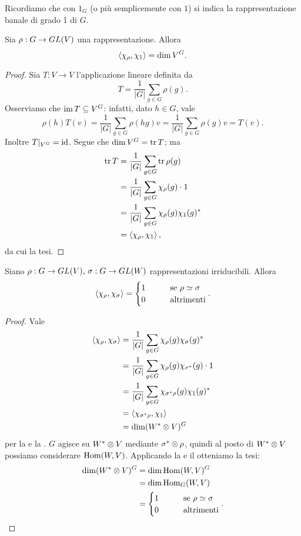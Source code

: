 Ricordiamo che con $1_G$ (o più semplicemente con $1$) si indica la rappresentazione banale di grado 1 di $G$.

\begin{proposition}
Sia $\rho:G\to GL(V)$ una rappresentazione. Allora
$$
\left\langle\chi_\rho,\chi_1\right\rangle=\dim V^G.
$$
\end{proposition}
\begin{proof}
Sia $T:V\to V$ l'applicazione lineare definita da
$$
T=\frac{1}{|G|}\sum_{g\in G}\rho(g).
$$
Osserviamo che $\operatorname{im} T\subseteq V^G$: infatti, dato $h\in G$, vale
$$
\rho(h)T(v)=\frac{1}{|G|}\sum_{g\in G}\rho(hg)v=\frac{1}{|G|}\sum_{g\in G}\rho(g)v=T(v).
$$
Inoltre $T|_{V^G}=\operatorname{id}$. Segue che $\dim V^G=\operatorname{tr} T$; ma
\begin{align*}
\operatorname{tr} T&=\frac{1}{|G|}\sum_{g\in G}\operatorname{tr}\rho(g)\\
&=\frac{1}{|G|}\sum_{g\in G}\chi_\rho(g)\cdot1\\
&=\frac{1}{|G|}\sum_{g\in G}\chi_\rho(g)\chi_1(g)^*\\
&=\left\langle\chi_\rho,\chi_1\right\rangle,
\end{align*}
da cui la tesi.
\end{proof}

\begin{proposition}
Siano $\rho:G\to GL(V),\,\allowbreak\sigma:G\to GL(W)$ rappresentazioni irriducibili. Allora 
$$
\left\langle\chi_\rho,\chi_\sigma\right\rangle=
\begin{cases}
1\qquad&\text{se $\rho\simeq\sigma$}\\
0\qquad&\text{altrimenti}
\end{cases}.
$$
\end{proposition}
\begin{proof}
Vale
\begin{align*}
\left\langle\chi_\rho,\chi_\sigma\right\rangle&=\frac{1}{|G|}\sum_{g\in G}\chi_\rho(g)\chi_\sigma(g)^*\\
&=\frac{1}{|G|}\sum_{g\in G}\chi_\rho(g)\chi_{\sigma^*}(g)\cdot1\\
&=\frac{1}{|G|}\sum_{g\in G}\chi_{\sigma^*\rho}(g)\chi_1(g)^*\\
&=\left\langle\chi_{\sigma^*\rho},\chi_1\right\rangle\\
&=\dim(W^*\otimes V)^G
\end{align*}
per la  e la . $G$ agisce su $W^*\otimes V$ mediante $\sigma^*\otimes\rho$, quindi al posto di $W^*\otimes V$ possiamo considerare $\operatorname{Hom}(W,V)$. Applicando la  e il  otteniamo la tesi:
\begin{align*}
\dim(W^*\otimes V)^G&=\dim\operatorname{Hom}(W,V)^G\\
&=\dim\operatorname{Hom}_G(W,V)\\
&=
\begin{cases}
1\qquad&\text{se $\rho\simeq\sigma$}\\
0\qquad&\text{altrimenti}
\end{cases}.
\end{align*}
\end{proof}

